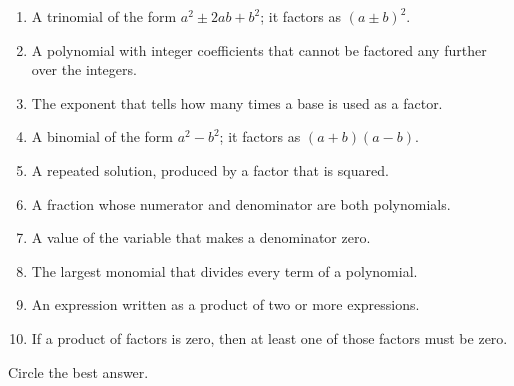 \vspace{6pt}
\begin{enumerate}[label=(\Alph*), leftmargin=2.4em, itemsep=1pt, topsep=2pt, font=\bfseries]
  \small
  \item A trinomial of the form $a^2 \pm 2ab + b^2$; it factors as $(a \pm b)^2$.
  \item A polynomial with integer coefficients that cannot be factored any further over the integers.
  \item The exponent that tells how many times a base is used as a factor.
  \item A binomial of the form $a^2-b^2$; it factors as $(a+b)(a-b)$.
  \item A repeated solution, produced by a factor that is squared.
  \item A fraction whose numerator and denominator are both polynomials.
  \item A value of the variable that makes a denominator zero.
  \item The largest monomial that divides every term of a polynomial.
  \item An expression written as a product of two or more expressions.
  \item If a product of factors is zero, then at least one of those factors must be zero.
\end{enumerate}


\noindent\small Circle the best answer.

